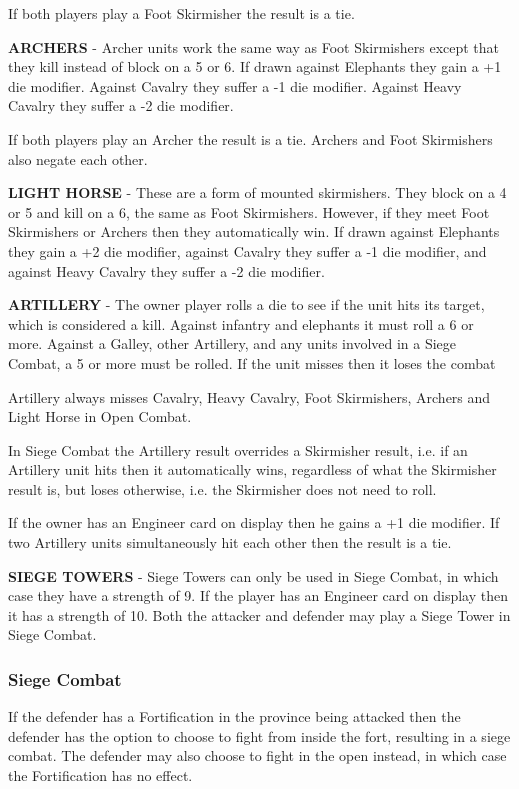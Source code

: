 If both players play a Foot Skirmisher the result is a tie.

\textbf{ARCHERS} - Archer units work the same way as Foot Skirmishers except that they kill instead of block on a 5 or 6. If drawn against Elephants they gain a +1 die modifier. Against Cavalry they suffer a -1 die modifier. Against Heavy Cavalry they suffer a -2 die modifier.

If both players play an Archer the result is a tie. Archers and Foot Skirmishers also negate each other.

\textbf{LIGHT HORSE} - These are a form of mounted skirmishers. They block on a 4 or 5 and kill on a 6, the same as Foot Skirmishers. However, if they meet Foot Skirmishers or Archers then they automatically win. If drawn against Elephants they gain a +2 die modifier, against Cavalry they suffer a -1 die modifier, and against Heavy Cavalry they suffer a -2 die modifier.

\textbf{ARTILLERY} - The owner player rolls a die to see if the unit hits its target, which is considered a kill. Against infantry and elephants it must roll a 6 or more. Against a Galley, other Artillery, and any units involved in a Siege Combat, a 5 or more must be rolled. If the unit misses then it loses the combat

Artillery always misses Cavalry, Heavy Cavalry, Foot Skirmishers, Archers and Light Horse in Open Combat.

In Siege Combat the Artillery result overrides a Skirmisher result, i.e. if an Artillery unit hits then it automatically wins, regardless of what the Skirmisher result is, but loses otherwise, i.e. the Skirmisher does not need to roll.

If the owner has an Engineer card on display then he gains a +1 die modifier. If two Artillery units simultaneously hit each other then the result is a tie.

\textbf{SIEGE TOWERS} - Siege Towers can only be used in Siege Combat, in which case they have a strength of 9. If the player has an Engineer card on display then it has a strength of 10. Both the attacker and defender may play a Siege Tower in Siege Combat.

\subsubsection{Siege Combat}

If the defender has a Fortification in the province being attacked then the defender has the option to choose to fight from inside the fort, resulting in a siege combat. The defender may also choose to fight in the open instead, in which case the Fortification has no effect.

